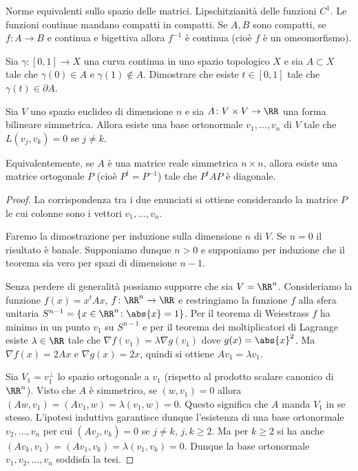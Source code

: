 


Norme equivalenti sullo spazio delle matrici. Lipschitzianità delle funzioni $C^1$.
Le funzioni continue mandano compatti in compatti.
Se $A,B$ sono compatti, se $f\colon A\to B$ e continua e bigettiva allora 
$f^{-1}$ è continua (cioè $f$ è un omeomorfismo).



\begin{exercise}
  \label{ex:punto-di-frontiera}
Sia $\gamma\colon [0,1] \to X$ una curva continua in uno 
spazio topologico $X$ e sia $A\subset X$ tale che 
$\gamma(0)\in A$ e $\gamma(1)\notin A$.
Dimostrare che esiste $t \in [0,1]$ tale che $\gamma(t) \in \partial A$.
\end{exercise}



\begin{theorem}
Sia $V$ uno spazio euclideo di dimensione $n$ e sia 
$A\colon V\times V \to \RR$ 
una forma bilineare simmetrica.
Allora esiste una base ortonormale $v_1,\dots,v_n$ di $V$
tale che $L(v_j,v_k) = 0$ se $j\neq k$. 

Equivalentemente, se $A$ è una matrice reale simmetrica $n\times n$,
allora esiste una matrice ortogonale $P$ (cioè $P^t=P^{-1}$) tale che
$P^t A P$ è diagonale.
\end{theorem}
%
\begin{proof}
La corrispondenza tra i due enunciati si ottiene 
considerando la matrice $P$ le cui colonne sono i vettori
$v_1,\dots,v_n$.

Faremo la dimostrazione per induzione sulla dimensione $n$ di $V$.
Se $n=0$ il risultato è banale. 
Supponiamo dunque $n>0$ e supponiamo per induzione che il teorema sia vero
per spazi di dimensione $n-1$.

Senza perdere di generalità possiamo supporre che sia $V = \RR^n$.
Consideriamo la funzione $f(x) = x^t A x$, $f\colon \RR^n\to \RR$ e restringiamo 
la funzione $f$ alla sfera unitaria $S^{n-1} = \{ x \in \RR^n \colon \abs{x} = 1\}$.
Per il teorema di Weiestrass $f$ ha minimo in un punto $v_1$ su $S^{n-1}$ 
e per il teorema dei moltiplicatori di Lagrange
esiste $\lambda \in \RR$ tale che $\nabla f(v_1) = \lambda \nabla g(v_1)$
dove $g(x) = \abs{x}^2$. Ma $\nabla f(x) = 2 A x$ e $\nabla g(x) = 2 x$, quindi si ottiene
$A v_1 = \lambda v_1$.

Sia $V_1 = v_1^\perp$ lo spazio ortogonale a $v_1$ (rispetto al prodotto scalare canonico di $\RR^n$).
Visto che $A$ è simmetrico, se $(w,v_1)=0$ allora 
$(Aw,v_1) = (Av_1,w) = \lambda (v_1,w) = 0$.
Questo significa che $A$ manda $V_1$ in se stesso.
L'ipotesi induttiva garantisce dunque l'esistenza di una base ortonormale 
$v_2,\dots,v_n$ per cui $(Av_j,v_k) = 0$ se $j\neq k$, $j,k\ge 2$.
Ma per $k\ge 2$ si ha anche $(Av_k,v_1) = (Av_1,v_k) = \lambda (v_1,v_k) = 0$.
Dunque la base ortonormale $v_1, v_2,\dots,v_n$ soddisfa la tesi.
\end{proof}



